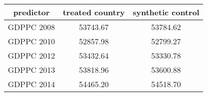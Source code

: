 \begin{tabular}{c|c|c}
predictor&\textbf{treated country}&\textbf{synthetic control}\\
\hline 
GDPPC 2008 & 53743.67 & 53784.62\\
GDPPC 2010 & 52857.98 & 52799.27\\
GDPPC 2012 & 53432.64 & 53330.78\\
GDPPC 2013 & 53818.96 & 53600.88\\
GDPPC 2014 & 54465.20 & 54518.70\\
\hline
\end{tabular}
